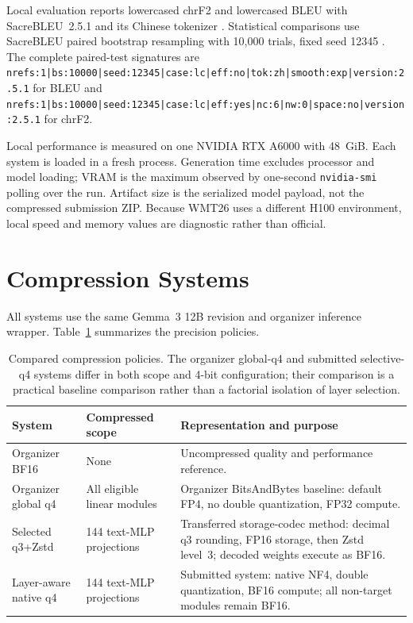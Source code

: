 \documentclass[11pt]{article}
\begin{document}
Local evaluation reports lowercased chrF2 \citep{popovic-2015-chrf} and lowercased BLEU with SacreBLEU~2.5.1 and its Chinese tokenizer \citep{post-2018-call}. Statistical comparisons use SacreBLEU paired bootstrap resampling with 10,000 trials, fixed seed 12345 \citep{koehn-2004-statistical}. The complete paired-test signatures are \nolinkurl{nrefs:1|bs:10000|seed:12345|case:lc|eff:no|tok:zh|smooth:exp|version:2.5.1} for BLEU and \nolinkurl{nrefs:1|bs:10000|seed:12345|case:lc|eff:yes|nc:6|nw:0|space:no|version:2.5.1} for chrF2.

Local performance is measured on one NVIDIA RTX A6000 with 48~GiB. Each system is loaded in a fresh process. Generation time excludes processor and model loading; VRAM is the maximum observed by one-second \texttt{nvidia-smi} polling over the run. Artifact size is the serialized model payload, not the compressed submission ZIP. Because WMT26 uses a different H100 environment, local speed and memory values are diagnostic rather than official.

\section{Compression Systems}

All systems use the same Gemma~3 12B revision and organizer inference wrapper. Table~\ref{tab:methods} summarizes the precision policies.

\begin{table}[t]
\centering
\small
\begin{tabular}{p{}p{}p{}}
\toprule
System & Compressed scope & Representation and purpose \\
\midrule
Organizer BF16 & None & Uncompressed quality and performance reference. \\
Organizer global q4 & All eligible linear modules & Organizer BitsAndBytes baseline: default FP4, no double quantization, FP32 compute. \\
Selected q3+Zstd & 144 text-MLP projections & Transferred storage-codec method: decimal q3 rounding, FP16 storage, then Zstd level~3; decoded weights execute as BF16. \\
Layer-aware native q4 & 144 text-MLP projections & Submitted system: native NF4, double quantization, BF16 compute; all non-target modules remain BF16. \\
\bottomrule
\end{tabular}
\caption{Compared compression policies. The organizer global-q4 and submitted selective-q4 systems differ in both scope and 4-bit configuration; their comparison is a practical baseline comparison rather than a factorial isolation of layer selection.}
\label{tab:methods}
\end{table}
\end{document}
